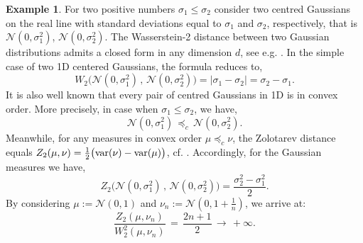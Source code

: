 \documentclass[11pt,reqno]{amsart}
\theoremstyle{definition}
\newtheorem{remark}[theorem]{Remark}
\newtheorem{example}[theorem]{Example}
\numberwithin{equation}{section}
\newcommand{\R}{\mathbb{R}}
\newcommand{\var}{{\rm{var}}}
\newcommand{\PP}{\mathcal{P}}
\newcommand{\abs}[1]{{\left \lvert #1 \right \rvert}}
\newcommand{\red}{\textcolor{red}}
\newcommand{\blue}{\textcolor{blue}}
\begin{document}
    \begin{example}
    \label{opt1/2}
    For two positive numbers $\sigma_1 \leq \sigma_2$ consider two centred Gaussians on the real line with standard deviations equal to $\sigma_1$ and $\sigma_2$, respectively, that is $\mathcal{N}(0,\sigma^2_1)$, $\mathcal{N}(0,\sigma^2_2)$.
    The Wasserstein-2 distance between two Gaussian distributions admits a closed form in any dimension $d$, see e.g. \cite{dowson1982}. In the simple case of two 1D centered Gaussians, the formula reduces to,
    \begin{equation}
        W_2\Big(\mathcal{N}(0,\sigma^2_1) \, ,\, \mathcal{N}(0,\sigma^2_2)\Big) = \abs{\sigma_1-\sigma_2} = \sigma_2 -\sigma_1.
    \end{equation}
    It is also well known that every pair of centred Gaussians  in 1D is in convex order. More precisely, in case when $\sigma_1 \leq \sigma_2$, we have,
    \begin{equation*}
        \mathcal{N}(0,\sigma^2_1) \, \preceq_c \, \mathcal{N}(0,\sigma^2_2).
    \end{equation*}
    Meanwhile, for any  measures in convex order $\mu \preceq_c \nu$, the Zolotarev distance equals $Z_2(\mu,\nu) = \frac{1}{2} \big( \var(\nu) - \var(\mu) \big)$, cf. \cite[Section 4.1]{bolbou2024}. Accordingly, for the Gaussian measures we have,
    \begin{equation}
        Z_2\Big(\mathcal{N}(0,\sigma^2_1) \, ,\, \mathcal{N}(0,\sigma^2_2)\Big) = \frac{\sigma_2^2 - \sigma_1^2}{2}. 
    \end{equation}
  By considering  $\mu:=\mathcal{N}(0,1)$ and $\nu_n:=\mathcal{N}(0,1+ \frac1{n})$,  we arrive at: 
        \begin{equation*}
        \frac{ Z_2(\mu,\nu_n)}{ W_2^2(\mu,\nu_n)}\,  =\, \frac{2n +1}{2}\, \to \, +\infty .
    \end{equation*}
\end{example}
\end{document}
